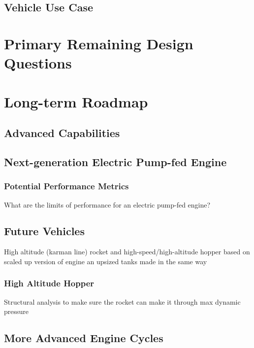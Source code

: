 \documentclass[12pt, letterpaper]{article}
\begin{document}
\subsection{Vehicle Use Case}

\section{Primary Remaining Design Questions}

\section{Long-term Roadmap}
\subsection{Advanced Capabilities}
\subsection{Next-generation Electric Pump-fed Engine}
\subsubsection{Potential Performance Metrics}
What are the limits of performance for an electric pump-fed engine?

\subsection{Future Vehicles}
High altitude (karman line) rocket and high-speed/high-altitude hopper based on scaled up version of engine an upsized tanks made in the same way

\subsubsection{High Altitude Hopper}
Structural analysis to make sure the rocket can make it through max dynamic pressure
\subsection{More Advanced Engine Cycles}
\end{document}
